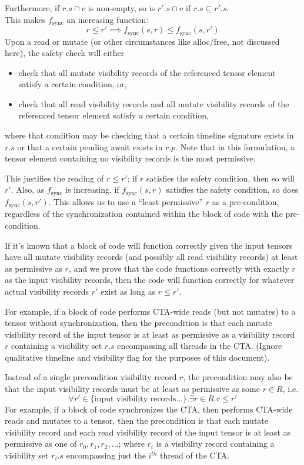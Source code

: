 Furthermore, if $r.s \cap v$ is non-empty, so is $r'.s \cap v$ if $r.s \subseteq r'.s$.\\
This makes $f_\mathrm{sync}$ an increasing function:
\begin{equation*}
  r \leq r' \implies f_\mathrm{sync}(s, r) \leq f_\mathrm{sync}(s, r')
\end{equation*}
Upon a read or mutate (or other circumstances like alloc/free, not discussed here), the safety check will either
\begin{itemize}
  \item check that all mutate visibility records of the referenced tensor element satisfy a certain condition, or,
  \item check that all read visibility records and all mutate visibility records of the referenced tensor element satisfy a certain condition,
\end{itemize}
where that condition may be checking that a certain timeline signature exists in $r.s$ or that a certain pending await exists in $r.p$.
Note that in this formulation, a tensor element containing no visibility records is the most permissive.

This justifies the  reading of $r \leq r'$; if $r$ satisfies the safety condition, then so will $r'$.
Also, as $f_\mathrm{sync}$ is increasing, if $f_\mathrm{sync}(s, r)$ satisfies the safety condition, so does $f_\mathrm{sync}(s, r')$.
This allows us to use a ``least permissive'' $r$ as a pre-condition, regardless of the synchronization contained within the block of code with the pre-condition.

If it's known that a block of code will function correctly given the input tensors have all mutate visibility records (and possibly all read visibility records) at least as permissive as $r$, and we prove that the code functions correctly with exactly $r$ as the input visibility records, then the code will function correctly for whatever actual visibility records $r'$ exist as long as $r \leq r'$.

For example, if a block of code performs CTA-wide reads (but not mutates) to a tensor without synchronization, then the precondition is that each mutate visibility record of the input tensor is at least as permissive as a visibility record $r$ containing a visibility set $r.s$ encompassing all threads in the CTA. (Ignore qualitative timeline and visibility flag for the purposes of this document).

Instead of a single precondition visibility record $r$, the precondition may also be that the input visibility records must be at least as permissive as some $r \in R$, i.e.
\begin{equation*}
    \forall r' \in \text{\{input visibility records...\}}. \exists r \in R. r \leq r'
\end{equation*}
For example, if a block of code synchronizes the CTA, then performs CTA-wide reads and mutates to a tensor, then the precondition is that each mutate visibility record and each read visibility record of the input tensor is at least as permissive as one of $r_0, r_1, r_2, ...$; where $r_i$ is a visibility record containing a visibility set $r_i.s$ encompassing just the $i^{th}$ thread of the CTA.
